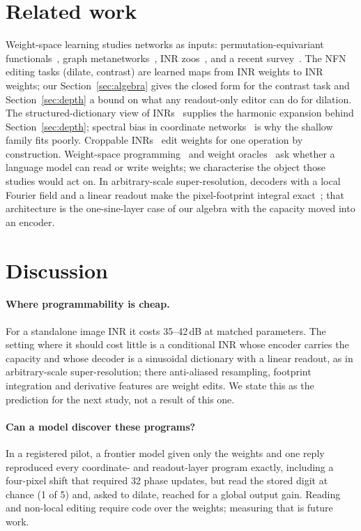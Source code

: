 \documentclass[11pt]{article}
\begin{document}
\section{Related work}
Weight-space learning studies networks as inputs: permutation-equivariant functionals~\citep{zhou2023nfn,zhou2023nft}, graph metanetworks~\citep{kofinas2025internal}, INR zoos~\citep{ma2024implicitzoo}, and a recent survey~\citep{han2026survey}. The NFN editing tasks (dilate, contrast) are learned maps from INR weights to INR weights; our Section~\ref{sec:algebra} gives the closed form for the contrast task and Section~\ref{sec:depth} a bound on what any readout-only editor can do for dilation. The structured-dictionary view of INRs~\citep{yuce2022structured} supplies the harmonic expansion behind Section~\ref{sec:depth}; spectral bias in coordinate networks~\citep{tancik2020fourier} is why the shallow family fits poorly. Croppable INRs~\citep{ashkenazi2024croppable} edit weights for one operation by construction. Weight-space programming~\citep{takehi2026sparks} and weight oracles~\citep{kabra2026oracles} ask whether a language model can read or write weights; we characterise the object those studies would act on. In arbitrary-scale super-resolution, decoders with a local Fourier field and a linear readout make the pixel-footprint integral exact~\citep{lee2022lte}; that architecture is the one-sine-layer case of our algebra with the capacity moved into an encoder.

\section{Discussion}
\paragraph{Where programmability is cheap.} For a standalone image INR it costs 35--42\,dB at matched parameters. The setting where it should cost little is a conditional INR whose encoder carries the capacity and whose decoder is a sinusoidal dictionary with a linear readout, as in arbitrary-scale super-resolution; there anti-aliased resampling, footprint integration and derivative features are weight edits. We state this as the prediction for the next study, not a result of this one.
\paragraph{Can a model discover these programs?} In a registered pilot, a frontier model given only the weights and one reply reproduced every coordinate- and readout-layer program exactly, including a four-pixel shift that required 32 phase updates, but read the stored digit at chance (1 of 5) and, asked to dilate, reached for a global output gain. Reading and non-local editing require code over the weights; measuring that is future work.
\end{document}
